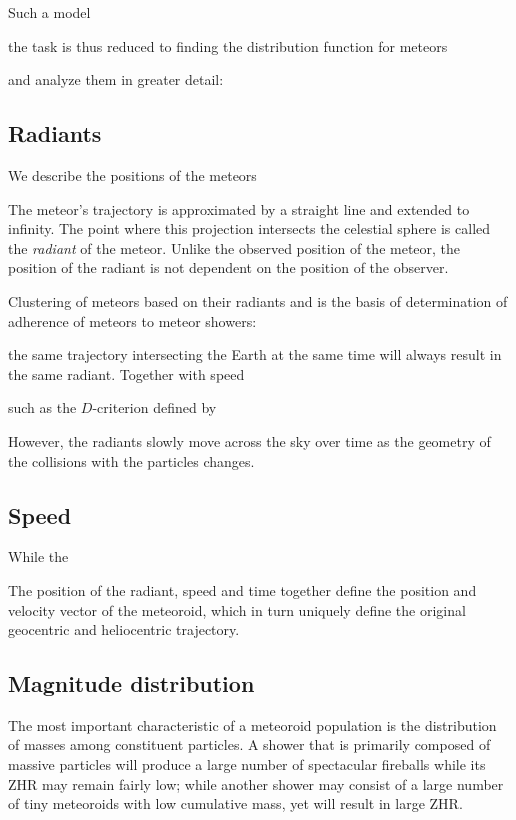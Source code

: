     Such a model 

    the task is thus reduced to finding the distribution function for meteors

    and analyze them in greater detail:


    \subsection{Radiants} \label{msr}        
        We describe the positions of the meteors

        The meteor's trajectory is approximated by a straight line and extended to infinity.
        The point where this projection intersects the celestial sphere is called the \emph{radiant} of the meteor.
        Unlike the observed position of the meteor, the position of the radiant is not dependent on
        the position of the observer.

        Clustering of meteors based on their radiants and is the basis of determination of
        adherence of meteors to meteor showers:

        the same trajectory intersecting the Earth at the same time will always result
        in the same radiant. Together with speed 

        such as the $D$-criterion defined by \citep{southworth+1964}

        However, the radiants slowly move across the sky over time as the geometry of the collisions
        with the particles changes.

    \subsection{Speed} \label{mss}
        While the 

        The position of the radiant, speed and time together define the position and velocity vector of the meteoroid,
        which in turn uniquely define the original geocentric and heliocentric trajectory.

    \subsection{Magnitude distribution} \label{msm}
        The most important characteristic of a meteoroid population is the distribution of masses
        among constituent particles. A shower that is primarily composed of massive particles
        will produce a large number of spectacular fireballs while its ZHR may remain fairly low;
        while another shower may consist of a large number of tiny meteoroids with low cumulative mass,
        yet will result in large ZHR.

